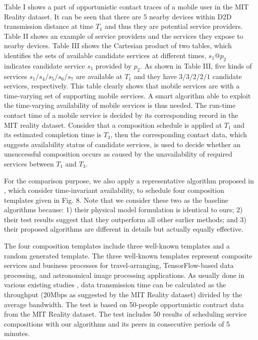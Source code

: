 \documentclass[journal]{IEEEtran}
\begin{document}
Table I shows a part of opportunistic contact traces of a mobile user in the MIT Reality dataset. It can be seen that there are 5 nearby devices within D2D transmission distance at time $T_1$ and thus they are potential service providers. Table II shows an example of service providers and the services they expose to nearby devices. Table III shows the Cartesian product of two tables, which identifies the sets of available candidate services at different times, $s_1$@$p_2$ indicates candidate service $s_1$ provided by $p_2$.
As shown in Table III, five kinds of services $s_1/s_4/s_5/s_6/s_7$ are available at $T_1$ and they have $3/3/2/2/1$ candidate services, respectively.
This table clearly shows that mobile services are with a time-varying set of supporting mobile services.
A smart algorithm able to exploit the time-varying availability of mobile services is thus needed. The run-time contact time of a mobile service is decided by its corresponding record in the MIT reality dataset. Consider that a composition schedule is applied at $T_1$ and its estimated completion time is $T_3$, then the corresponding contact data, which suggests availability status of candidate services, is used to decide whether an unsuccessful composition occurs as caused by the unavailability of required services between $T_1$ and $T_3$.

For the comparison purpose, we also apply a representative algorithm proposed in \cite{Deng2017} \cite{sadiq2015service}, which consider time-invariant availability, to schedule four composition templates given in Fig. 8. Note that we consider these two as the baseline algorithms because: 1) their physical model formulation is identical to ours; 2) their test results suggest that they outperform all other earlier methods; and 3) their proposed algorithms are different in details but actually equally effective.

The four composition templates include three well-known templates and a random generated template. The three well-known templates represent composite services and business processes for travel-arranging, TensorFlow-based data processing, and astronomical image processing applications. As usually done in various existing studies \cite{Meena2016Cost, Rodriguez2014Deadline}, data transmission time can be calculated as the throughput (20Mbps as suggested by the MIT Reality dataset) divided by the average bandwidth. 
The test is based on 50-people opportunistic contract data from the MIT Reality dataset. The test includes 50 results of scheduling service compositions with our algorithms and its peers in consecutive periods of 5 minutes. 
\end{document}
